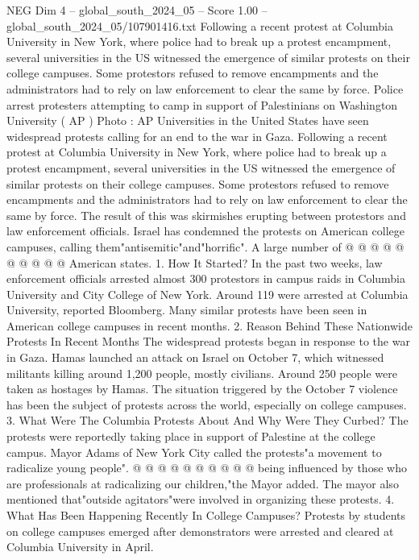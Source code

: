 \begin{textsample}{NEG Dim 4 – global\_south\_2024\_05 – Score 1.00 – global\_south\_2024\_05/107901416.txt}  \label{ex:f4_neg_271}
Following a recent protest at Columbia University in New York, where police had to break up a protest encampment, several universities in the US witnessed the emergence of similar protests on their college campuses.
Some protestors refused to remove encampments and the administrators had to rely on law enforcement to clear the same by force.
Police arrest protesters attempting to camp in support of Palestinians on Washington University ( AP ) Photo : AP Universities in the United States have seen widespread protests calling for an end to the war in Gaza.
Following a recent protest at Columbia University in New York, where police had to break up a protest encampment, several universities in the US witnessed the emergence of similar protests on their college campuses.
Some protestors refused to remove encampments and the administrators had to rely on law enforcement to clear the same by force.
The result of this was skirmishes erupting between protestors and law enforcement officials.
Israel has condemned the protests on American college campuses, calling them"antisemitic"and"horrific".
A large number of @ @ @ @ @ @ @ @ @ @ American states. 1.
How It Started?
In the past two weeks, law enforcement officials arrested almost 300 protestors in campus raids in Columbia University and City College of New York.
Around 119 were arrested at Columbia University, reported Bloomberg.
Many similar protests have been seen in American college campuses in recent months. 2.
Reason Behind These Nationwide Protests In Recent Months The widespread protests began in response to the war in Gaza.
Hamas launched an attack on Israel on October 7, which witnessed militants killing around 1,200 people, mostly civilians.
Around 250 people were taken as hostages by Hamas.
The situation triggered by the October 7 violence has been the subject of protests across the world, especially on college campuses. 3.
What Were The Columbia Protests About And Why Were They Curbed?
The protests were reportedly taking place in support of Palestine at the college campus.
Mayor Adams of New York City called the protests"a movement to radicalize young people". @ @ @ @ @ @ @ @ @ @ being influenced by those who are professionals at radicalizing our children,"the Mayor added.
The mayor also mentioned that"outside agitators"were involved in organizing these protests. 4.
What Has Been Happening Recently In College Campuses?
Protests by students on college campuses emerged after demonstrators were arrested and cleared at Columbia University in April.

\end{textsample}
